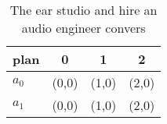 \documentclass[a4paper]{article}
\begin{document}
\begin{table}
\begin{adjustbox}{width=0.5\columnwidth}
\begin{tabular}{|l|l|l|l|}
\hline
\textbf{plan} & \multicolumn{1}{c|}{\textbf{0}} & \multicolumn{1}{c|}{\textbf{1}} & \multicolumn{1}{c|}{\textbf{2}} \\ \hline
\textbf{$a_0$}  & (0,0) & (1,0) & (2,0) \\ \hline
\textbf{$a_1$}  & (0,0) & (1,0) & (2,0) \\ \hline
\end{tabular}
\end{adjustbox}
\caption{The ear studio and hire an audio engineer convers
}
\end{table}
\end{document}
